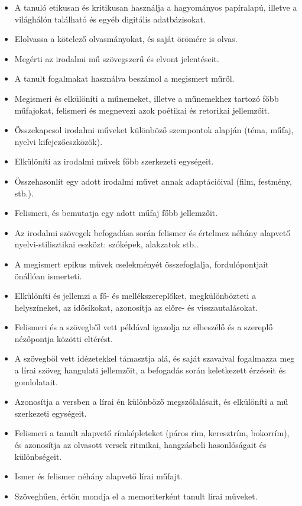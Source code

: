 \begin{itemize}
\item
  A tanuló etikusan és kritikusan használja a hagyományos papíralapú,
  illetve a világhálón található és egyéb digitális adatbázisokat.
\item
  Elolvassa a kötelező olvasmányokat, és saját örömére is olvas.
\item
  Megérti az irodalmi mű szövegszerű és elvont jelentéseit.
\item
  A tanult fogalmakat használva beszámol a megismert műről.
\item
  Megismeri és elkülöníti a műnemeket, illetve a műnemekhez tartozó főbb
  műfajokat, felismeri és megnevezi azok poétikai és retorikai
  jellemzőit.
\item
  Összekapcsol irodalmi műveket különböző szempontok alapján (téma,
  műfaj, nyelvi kifejezőeszközök).
\item
  Elkülöníti az irodalmi művek főbb szerkezeti egységeit.
\item
  Összehasonlít egy adott irodalmi művet annak adaptációival (film,
  festmény, stb.).
\item
  Felismeri, és bemutatja egy adott műfaj főbb jellemzőit.
\item
  Az irodalmi szövegek befogadása során felismer és értelmez néhány
  alapvető nyelvi-stilisztikai eszközt: szóképek, alakzatok stb..
\item
  A megismert epikus művek cselekményét összefoglalja, fordulópontjait
  önállóan ismerteti.
\item
  Elkülöníti és jellemzi a fő- és mellékszereplőket, megkülönbözteti a
  helyszíneket, az idősíkokat, azonosítja az előre- és visszautalásokat.
\item
  Felismeri és a szövegből vett példával igazolja az elbeszélő és a
  szereplő nézőpontja közötti eltérést.
\item
  A szövegből vett idézetekkel támasztja alá, és saját szavaival
  fogalmazza meg a lírai szöveg hangulati jellemzőit, a befogadás során
  keletkezett érzéseit és gondolatait.
\item
  Azonosítja a versben a lírai én különböző megszólalásait, és
  elkülöníti a mű szerkezeti egységeit.
\item
  Felismeri a tanult alapvető rímképleteket (páros rím, keresztrím,
  bokorrím), és azonosítja az olvasott versek ritmikai, hangzásbeli
  hasonlóságait és különbségeit.
\item
  Ismer és felismer néhány alapvető lírai műfajt.
\item
  Szöveghűen, értőn mondja el a memoriterként tanult lírai műveket.

\end{itemize}
